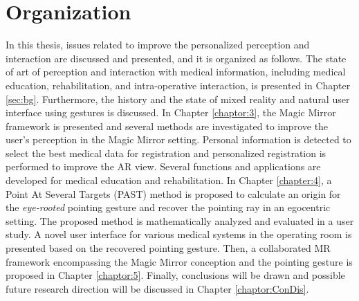 \section{Organization}
In this thesis, issues related to improve the personalized perception and interaction are discussed and presented, and it is organized as follows. 
The state of art of perception and interaction with medical information, including medical education, rehabilitation, and intra-operative interaction, is presented in Chapter \ref{sec:bg}. Furthermore, the history and the state of mixed reality and natural user interface using gestures is discussed.
In Chapter \ref{chaptor:3}, the Magic Mirror framework is presented and several methods are investigated to improve the user's perception in the Magic Mirror setting. Personal information is detected to select the best medical data for registration and personalized registration is performed to improve the AR view.  Several functions and applications are developed for medical education and rehabilitation.
In Chapter \ref{chapter:4}, a Point At Several Targets (PAST) method is proposed to calculate an origin for the \textit{eye-rooted} pointing gesture and recover the pointing ray in an egocentric setting. The proposed method is mathematically analyzed and evaluated in a user study. A novel user interface for various medical systems in the operating room is presented based on the recovered pointing gesture. 
Then, a collaborated MR framework encompassing the Magic Mirror conception and the pointing gesture is proposed in Chapter \ref{chaptor:5}. 
Finally, conclusions will be drawn and possible future research direction will be discussed in Chapter \ref{chaptor:ConDis}.
